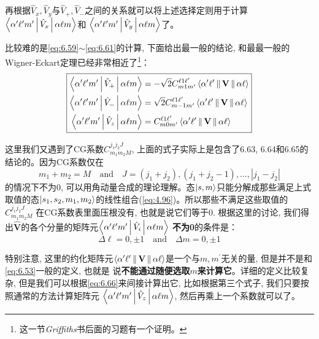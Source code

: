 \documentclass[a4paper,zihao=-4,linespread=1]{ctexrep}
\begin{document}
    再根据$\hat{V}_x,\hat{V}_y$与$\hat{V}_+,\hat{V}_-$之间的关系就可以将上述选择定则用于计算$\Braket{\alpha^{\prime} \ell^{\prime} m^{\prime}|\hat{V}_{x}| \alpha \ell m}$和
    $\Braket{\alpha^{\prime} \ell^{\prime} m^{\prime}|\hat{V}_{y}| \alpha \ell m}$了。
    
    比较难的是\ref{eq:6.59}$\sim$\ref{eq:6.61}的计算, 下面给出最一般的结论, 和最最一般的Wigner-Eckart定理已经非常相近了\footnote{这一节{\itshape Griffiths}书后面的习题有一个证明。}：
    \begin{equation}
        \label{eq:6.66}
        \boxed{
            \begin{aligned}
                \Braket{\alpha^{\prime} \ell^{\prime} m^{\prime}|\hat{V}_{+}| \alpha \ell m}  & = -\sqrt{2}C^{\ell 1 \ell^\prime}_{m 1 m^\prime}\Braket{\alpha^\prime\ell^\prime\|\mathbf{V}\|\alpha\ell}\\
                \Braket{\alpha^{\prime} \ell^{\prime} m^{\prime}|\hat{V}_{-}| \alpha \ell m}  & =  \sqrt{2}C^{\ell 1 \ell^\prime}_{m -1 m^\prime}\Braket{\alpha^\prime\ell^\prime\|\mathbf{V}\|\alpha\ell}\\
                \Braket{\alpha^{\prime} \ell^{\prime} m^{\prime}|\hat{V}_{z}| \alpha \ell m}  & =  C^{\ell 1 \ell^\prime}_{m 0 m^\prime}\Braket{\alpha^\prime\ell^\prime\|\mathbf{V}\|\alpha\ell}
            \end{aligned}
        }
    \end{equation}
    
    这里我们又遇到了CG系数$C^{j_1j_2J}_{m_1m_2M}$, 上面的式子实际上是包含了6.63, 6.64和6.65的结论的。因为CG系数仅在
    \[m_1+m_2=M\quad\text{and}\quad J=(j_1+j_2),(j_1+j_2-1),\ldots,|j_1-j_2|\]
    的情况下不为0, 可以用角动量合成的理论理解。态$\ket{s,m}$只能分解成那些满足上式取值的态$\ket{s_1,s_2,m_1,m_2}$的线性组合(\ref{eq:4.96})。所以那些不满足这些取值的$C^{j_1j_2J}_{m_1m_2M}$
    在CG系数表里面压根没有, 也就是说它们等于0. 根据这里的讨论, 我们得出$\hat{\mathbf{V}}$的各个分量的矩阵元$\Braket{\alpha^{\prime} \ell^{\prime} m^{\prime}|\hat{V}_{i}| \alpha \ell m} $
    \textbf{不为0}的条件是：
    \begin{equation*}
        \boxed{
            \Delta \ell = 0,\pm 1\quad \text{and}\quad \Delta m = 0,\pm 1 
        }
    \end{equation*}

    特别注意, 这里的约化矩阵元$\Braket{\alpha^\prime\ell^\prime\|\mathbf{V}\|\alpha\ell}$是一个与$m,m^\prime$无关的量, 但是并不是和\ref{eq:6.53}一般的定义, 也就是
    说\textbf{不能通过随便选取$m$来计算它}。详细的定义比较复杂, 但是我们可以根据\ref{eq:6.66}来间接计算出它, 比如根据第三个式子, 我们只要按照通常的方法计算矩阵元
    $\Braket{\alpha^{\prime} \ell^{\prime} m^{\prime}|\hat{V}_{z}| \alpha \ell m} $, 然后再乘上一个系数就可以了。
\end{document}
